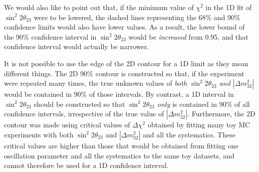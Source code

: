 \begin{enumerate}
We would also like to point out that, if the minimum value of $\chi^{2}$ in the 1D fit of $\sin^{2} 2 \theta_{23}$ were to be 
lowered, the dashed lines representing the 68\% and 90\% confidence limits would also have lower values. As a result, the lower 
bound of the 90\% confidence interval in $\sin^{2} 2 \theta_{23}$ would be \emph{increased} from 0.95, and that confidence interval 
would actually be narrower. 
 
It is not possible to use the edge of the 2D contour for a 1D limit as they mean different things. The 2D 90\% contour is constructed 
so that, if the experiment were repeated many times, the true unknown values of \emph{both $\sin^{2} 2 \theta_{23}$ and $|\Delta m^{2}_{32}|$} 
would be contained in 90\% of those intervals. By contrast, a 1D interval in $\sin^{2} 2 \theta_{23}$ should be constructed so that 
\emph{$\sin^{2} 2 \theta_{23}$ only} is contained in 90\% of all confidence intervals, irrespective of the true value of $|\Delta m^{2}_{32}|$. 
Furthermore, the 2D contour was made using critical values of $\Delta \chi^{2}$ obtained by fitting many toy MC experiments with both 
$\sin^{2} 2 \theta_{23}$ and $|\Delta m^{2}_{32}|$ and all the systematics. These critical values are higher than those that would be obtained 
from fitting one oscillation parameter and all the systematics to the same toy datasets, and cannot therefore be used for a 1D confidence interval.

\end{enumerate}
